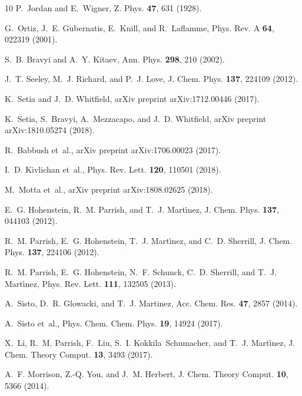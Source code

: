 \documentclass[aps,prl,twocolumn,showpacs,superscriptaddress,groupedaddress]{revtex4}  %
\begin{document}
\begin{thebibliography}{10}
P.~Jordan and E.~Wigner,
\newblock Z. Phys. {\bf 47}, 631 (1928).

G.~Ortiz, J.~E. Gubernatis, E.~Knill, and R.~Laflamme,
\newblock Phys. Rev. A {\bf 64}, 022319 (2001).

S.~B. Bravyi and A.~Y. Kitaev,
\newblock Ann. Phys. {\bf 298}, 210  (2002).

J.~T. Seeley, M.~J. Richard, and P.~J. Love,
\newblock J. Chem. Phys. {\bf 137}, 224109 (2012).

K.~Setia and J.~D. Whitfield,
\newblock arXiv preprint arXiv:1712.00446  (2017).

K.~Setia, S.~Bravyi, A.~Mezzacapo, and J.~D. Whitfield,
\newblock arXiv preprint arXiv:1810.05274  (2018).

R.~Babbush et~al.,
\newblock arXiv preprint arXiv:1706.00023  (2017).

I.~D. Kivlichan et~al.,
\newblock Phys. Rev. Lett. {\bf 120}, 110501 (2018).

M.~Motta et~al.,
\newblock arXiv preprint arXiv:1808.02625  (2018).

E.~G. Hohenstein, R.~M. Parrish, and T.~J. Mart\'{\i}nez,
\newblock J. Chem. Phys. {\bf 137}, 044103 (2012).

R.~M. Parrish, E.~G. Hohenstein, T.~J. Mart\'{\i}nez, and C.~D. Sherrill,
\newblock J. Chem. Phys. {\bf 137}, 224106 (2012).

R.~M. Parrish, E.~G. Hohenstein, N.~F. Schunck, C.~D. Sherrill, and T.~J.
  Mart{\'\i}nez,
\newblock Phys. Rev. Lett. {\bf 111}, 132505 (2013).

A.~Sisto, D.~R. Glowacki, and T.~J. Martinez,
\newblock Acc. Chem. Res. {\bf 47}, 2857 (2014).

A.~Sisto et~al.,
\newblock Phys. Chem. Chem. Phys. {\bf 19}, 14924 (2017).

X.~Li, R.~M. Parrish, F.~Liu, S.~I. Kokkila~Schumacher, and T.~J.
  Mart{\'\i}nez,
\newblock J. Chem. Theory Comput. {\bf 13}, 3493 (2017).

A.~F. Morrison, Z.-Q. You, and J.~M. Herbert,
\newblock J. Chem. Theory Comput. {\bf 10}, 5366 (2014).


\end{thebibliography}
\end{document}
